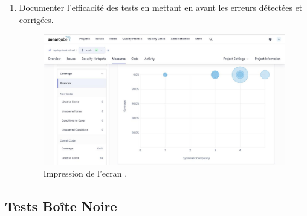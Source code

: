 \documentclass{article}
\begin{document}
\begin{enumerate}
    \item Documenter l’efficacité des tests en mettant en avant les erreurs détectées et corrigées.
      \begin{figure}[H]
    \centering
    \includegraphics[width=1\linewidth]{assets/IMG-20241215-WA0009.jpg}
    \caption{\label{fig:frog8} Impression de l'ecran .}
    \end{figure}

\end{enumerate}

\subsection{Tests Boîte Noire}
\end{document}
